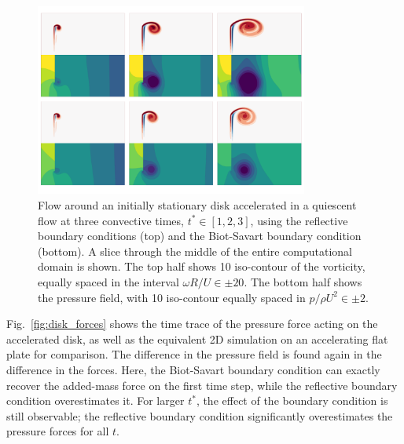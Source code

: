 \documentclass[final,1p,times]{elsarticle}
\begin{document}
\begin{figure}
    \centering
    \includegraphics[trim={0cm 1cm 0cm 0.5cm},clip,width=0.8\textwidth]{tex/fig/flow_disk.png}
    \caption{Flow around an initially stationary disk accelerated in a quiescent flow at three convective times, $t^*\in [1,2,3]$, using the reflective boundary conditions (top) and the Biot-Savart boundary condition (bottom). A slice through the middle of the entire computational domain is shown. The top half shows 10 iso-contour of the vorticity, equally spaced in the interval $\omega R/U\in\pm20$. The bottom half shows the pressure field, with 10 iso-contour equally spaced in $p/\rho U^2\in\pm2$.}
    \label{fig:disk_flow_1}
\end{figure}


Fig.~\ref{fig:disk_forces} shows the time trace of the pressure force acting on the accelerated disk, as well as the equivalent 2D simulation on an accelerating flat plate for comparison. The difference in the pressure field is found again in the difference in the forces. Here, the Biot-Savart boundary condition can exactly recover the added-mass force on the first time step, while the reflective boundary condition overestimates it. For larger $t^*$, the effect of the boundary condition is still observable; the reflective boundary condition significantly overestimates the pressure forces for all $t$. 
\end{document}
